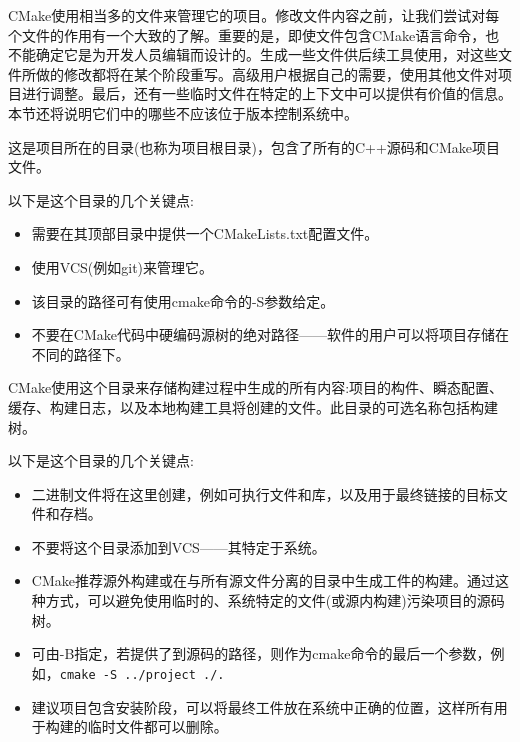 
CMake使用相当多的文件来管理它的项目。修改文件内容之前，让我们尝试对每个文件的作用有一个大致的了解。重要的是，即使文件包含CMake语言命令，也不能确定它是为开发人员编辑而设计的。生成一些文件供后续工具使用，对这些文件所做的修改都将在某个阶段重写。高级用户根据自己的需要，使用其他文件对项目进行调整。最后，还有一些临时文件在特定的上下文中可以提供有价值的信息。本节还将说明它们中的哪些不应该位于版本控制系统中。


这是项目所在的目录(也称为项目根目录)，包含了所有的C++源码和CMake项目文件。

以下是这个目录的几个关键点:

\begin{itemize}
\item 
需要在其顶部目录中提供一个CMakeLists.txt配置文件。

\item 
使用VCS(例如git)来管理它。

\item 
该目录的路径可有使用cmake命令的-S参数给定。

\item 
不要在CMake代码中硬编码源树的绝对路径——软件的用户可以将项目存储在不同的路径下。
\end{itemize}


CMake使用这个目录来存储构建过程中生成的所有内容:项目的构件、瞬态配置、缓存、构建日志，以及本地构建工具将创建的文件。此目录的可选名称包括构建树。

以下是这个目录的几个关键点:

\begin{itemize}
\item 
二进制文件将在这里创建，例如可执行文件和库，以及用于最终链接的目标文件和存档。

\item 
不要将这个目录添加到VCS——其特定于系统。

\item 
CMake推荐源外构建或在与所有源文件分离的目录中生成工件的构建。通过这种方式，可以避免使用临时的、系统特定的文件(或源内构建)污染项目的源码树。

\item 
可由-B指定，若提供了到源码的路径，则作为cmake命令的最后一个参数，例如，\texttt{cmake -S ../project ./.}

\item 
建议项目包含安装阶段，可以将最终工件放在系统中正确的位置，这样所有用于构建的临时文件都可以删除。
\end{itemize}


